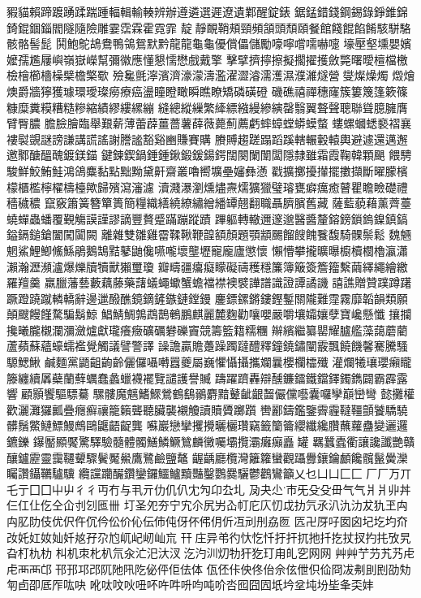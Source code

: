 豭貓賴蹄踱踴蹂踹踵輻輯輸輳辨辦遵遴選遲遼遺鄴醒錠錶
鋸錳錯錢鋼錫錄錚錐錦錡錕錮錙閻隧隨險雕霎霑霖霍霓霏
靛靜靦鞘頰頸頻頷頭頹頤餐館餞餛餡餚駭駢駱骸骼髻髭
鬨鮑鴕鴣鴦鴨鴒鴛默黔龍⿓龜⿔優償儡儲勵嚎嚀嚐嚅嚇嚏
壕壓壑壎嬰嬪嬤孺尷屨嶼嶺嶽嶸幫彌徽應懂懇懦懋戲戴擎
擊擘擠擰擦擬擱擢擭斂斃曙曖檀檔檄檢檜櫛檣橾檗檐檠歜
殮毚氈濘濱濟濠濛濤濫濯澀濬濡濩濕濮濰燧營燮燦燥燭
燬燴燠爵牆獰獲璩環璦璨癆療癌盪瞳瞪瞰瞬瞧瞭矯磷磺磴
磯礁禧禪穗窿簇簍篾篷簌篠糠糜糞糢糟糙糝縮績繆縷縲繃
縫總縱繅繁縴縹繈縵縿縯罄翳翼聱聲聰聯聳臆臃膺臂臀膿
膽臉膾臨舉艱薪薄蕾薜薑薔薯薛薇薨薊薦虧蟀蟑螳蟒蟆螫
螻螺蟈蟋褻褶襄褸褽覬謎謗謙講謊謠謝謄謐豁谿豳賺賽購
賸賻趨蹉蹋蹈蹊轄輾轂轅輿避遽還邁邂邀鄹醣醞醜鍍鎂錨
鍵鍊鍥鍋錘鍾鍬鍛鍰鍚鍔闊闋闌闈闆隱隸雖霜霞鞠韓顆颶
餵騁駿鮮鮫鮪鮭鴻鴿麋黏點黜黝黛鼾齋叢嚕嚮壙壘嬸彝懣
戳擴擲擾攆擺擻擷斷曜朦檳檬櫃檻檸櫂檮檯歟歸殯瀉瀋濾
瀆濺瀑瀏燻燼燾燸獷獵璧璿甕癖癘癒瞽瞿瞻瞼礎禮穡穢穠
竄竅簫簧簪簞簣簡糧織繕繞繚繡繒繙罈翹翻職聶臍臏舊藏
薩藍藐藉薰薺薹蟯蟬蟲蟠覆覲觴謨謹謬謫豐贅蹙蹣蹦蹤蹟
蹕軀轉轍邇邃邈醫醬釐鎔鎊鎖鎢鎳鎮鎬鎰鎘鎚鎗闔闖闐闕
離雜雙雛雞霤鞣鞦鞭韹額顏題顎顓颺餾餿餽餮馥騎髁鬃鬆
魏魎魍鯊鯉鯽鯈鯀鵑鵝鵠黠鼕鼬儳嚥嚨壞壟壢寵龐廬懲懷
懶懵攀攏曠曝櫥櫝櫚櫓瀛瀟瀨瀚瀝瀕瀘爆爍牘犢獸獺璽瓊
瓣疇疆癟癡矇礙禱穫穩簾簿簸簽簷籀繫繭繹繩繪繳羅羶羹
羸臘藩藝藪藕藤藥藷蟻蠅蠍蟹蟾襠襟襖襞譁譜識證譚譎譏
譆譙贈贊蹼蹲躇蹶蹬蹺蹴轔轎辭邊邋醱醮鏡鏑鏟鏃鏈鏜鏝
鏖鏢鏍鏘鏤鏗鏨關隴難霪霧靡韜韻類願顛颼饅饉騖騙鬍鯨
鯧鯖鯛鶉鵡鵲鵪鵬麒麗麓麴勸嚷嚶嚴嚼壤孀孃孽寶巉懸懺
攘攔攙曦朧櫬瀾瀰瀲爐獻瓏癢癥礦礪礬礫竇競籌籃籍糯糰
辮繽繼纂罌耀臚艦藻藹蘑藺蘆蘋蘇蘊蠔蠕襤覺觸議譬警譯
譟譫贏贍躉躁躅躂醴釋鐘鐃鏽闡霰飄饒饑馨騫騰騷騵鰓鰍
鹹麵黨鼯齟齣齡儷儸囁囀囂夔屬巍懼懾攝攜斕曩櫻欄櫺殲
灌爛犧瓖瓔癩矓籐纏續羼蘗蘭蘚蠣蠢蠡蠟襪襬覽譴護譽贓
躊躍躋轟辯醺鐮鐳鐵鐺鐸鐲鐫闢霸霹露響顧顥饗驅驃驀
騾髏魔魑鰭鰥鶯鶴鷂鶸麝黯鼙齜齦齧儼儻囈囊囉孿巔巒彎
懿攤權歡灑灘玀瓤疊癮癬禳籠籟聾聽臟襲襯觼讀贖贗躑躓
轡酈鑄鑑鑒霽霾韃韁顫饕驕驍髒鬚鱉鰱鰾鰻鷓鷗鼴齬齪龔
囌巖戀攣攫攪曬欐瓚竊籤籣籥纓纖纔臢蘸蘿蠱變邐邏鑣鑠
鑤靨顯饜驚驛驗髓體髑鱔鱗鱖鷥麟黴囑壩攬灞癱癲矗罐
羈蠶蠹衢讓讒讖艷贛釀鑪靂靈靄韆顰驟鬢魘鱟鷹鷺鹼鹽鼇
齷齲廳欖灣籬籮蠻觀躡釁鑲鑰顱饞髖鬣黌灤矚讚鑷韉驢驥
纜讜躪釅鑽鑾鑼鱷鱸黷豔鑿鸚爨驪鬱鸛鸞籲乂乜⼐凵⼕匚
⼚厂万丌乇亍⼞囗⼬屮⼻彳丏冇与丮亓仂仉仈冘勼卬厹圠
夃夬尐巿旡⽎殳毌⽓气⽙爿丱丼仨仜仩仡仝仚刌刉匜卌
圢圣夗夯宁宄尒尻屴屳帄庀庂忉戉扐氕氶汃氿氻犮犰玊⽱
禸肊阞伎优伬仵伔仱伀价伈伝伂伅伢伓伄仴伒冱刓刐劦匢
匟卍厊吇囡囟圮圪圴夼妀奼妅奻奾奷奿孖尕尥屼屺屻屾巟
幵庄异弚彴忕忔忏扜扞扤扡扦扢扙扠扚扥攷旯旮朾朹朸
朻机朿朼朳氘汆汒汜汏汊汔汋汌灱牞犴犵玎甪癿穵⽹网
⾋艸艼芀艽艿⾌虍⾑襾邙邗邘邛邔阢阤阠阣佖伻佢佉体
佤伾佧佒佟佁佘伭伳伿佡冏冹刜刞刡劭劮匉卣卲厎厏吰吷
吪呔呅吙吜吥吘吽呏呁吨吤呇囮囧囥坁坅坌坉坋坒夆奀妦
